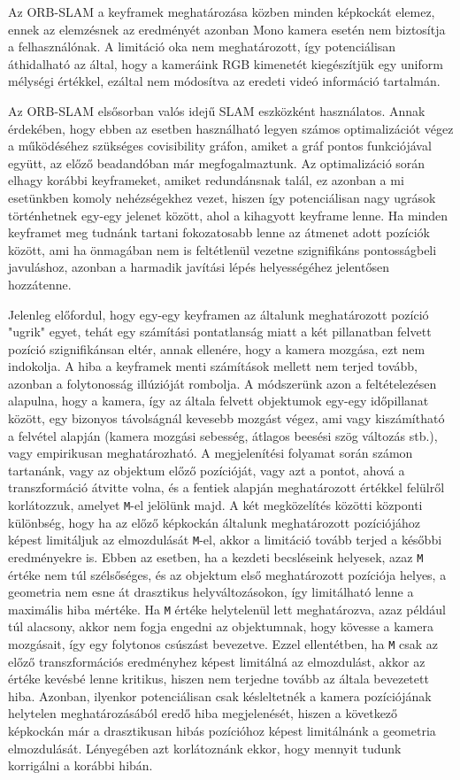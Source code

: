 Az ORB-SLAM a keyframek meghatározása közben minden képkockát elemez, ennek az elemzésnek az eredményét azonban Mono kamera esetén nem biztosítja a felhasználónak.
A limitáció oka nem meghatározott, így potenciálisan áthidalható az által, hogy a kameráink RGB kimenetét kiegészítjük egy uniform mélységi értékkel, ezáltal nem módosítva az eredeti videó információ tartalmán.

Az ORB-SLAM elsősorban valós idejű SLAM eszközként használatos.
Annak érdekében, hogy ebben az esetben használható legyen számos optimalizációt végez a működéséhez szükséges covisibility gráfon, amiket a gráf pontos funkciójával együtt, az előző beadandóban már megfogalmaztunk.
Az optimalizáció során elhagy korábbi keyframeket, amiket redundánsnak talál, ez azonban a mi esetünkben komoly nehézségekhez vezet, hiszen így potenciálisan nagy ugrások történhetnek egy-egy jelenet között, ahol a kihagyott keyframe lenne.
Ha minden keyframet meg tudnánk tartani fokozatosabb lenne az átmenet adott pozíciók között, ami ha önmagában nem is feltétlenül vezetne szignifikáns pontosságbeli javuláshoz, azonban a harmadik javítási lépés helyességéhez jelentősen hozzátenne.

Jelenleg előfordul, hogy egy-egy keyframen az általunk meghatározott pozíció "ugrik" egyet, tehát egy számítási pontatlanság miatt a két pillanatban felvett pozíció szignifikánsan eltér, annak ellenére, hogy a kamera mozgása, ezt nem indokolja.
A hiba a keyframek menti számítások mellett nem terjed tovább, azonban a folytonosság illúzióját rombolja.
A módszerünk azon a feltételezésen alapulna, hogy a kamera, így az általa felvett objektumok egy-egy időpillanat között, egy bizonyos távolságnál kevesebb mozgást végez, ami vagy kiszámítható a felvétel alapján (kamera mozgási sebesség, átlagos beesési szög változás stb.), vagy empirikusan meghatározható.
A megjelenítési folyamat során számon tartanánk, vagy az objektum előző pozícióját, vagy azt a pontot, ahová a transzformáció átvitte volna, és a fentiek alapján meghatározott értékkel felülről korlátozzuk, amelyet \texttt{M}-el jelölünk majd. 
A két megközelítés közötti központi különbség, hogy ha az előző képkockán általunk meghatározott pozíciójához képest limitáljuk az elmozdulását \texttt{M}-el, akkor a limitáció tovább terjed a későbbi eredményekre is.
Ebben az esetben, ha a kezdeti becsléseink helyesek, azaz \texttt{M} értéke nem túl szélsőséges, és az objektum első meghatározott pozíciója helyes, a geometria nem esne át drasztikus helyváltozásokon, így limitálható lenne a maximális hiba mértéke.
Ha \texttt{M} értéke helytelenül lett meghatározva, azaz például túl alacsony, akkor nem fogja engedni az objektumnak, hogy kövesse a kamera mozgásait, így egy folytonos csúszást bevezetve.
Ezzel ellentétben, ha \texttt{M} csak az előző transzformációs eredményhez képest limitálná az elmozdulást, akkor az értéke kevésbé lenne kritikus, hiszen nem terjedne tovább az általa bevezetett hiba.
Azonban, ilyenkor potenciálisan csak késleltetnék a kamera pozíciójának helytelen meghatározásából eredő hiba megjelenését, hiszen a következő képkockán már a drasztikusan hibás pozícióhoz képest limitálnánk a geometria elmozdulását.
Lényegében azt korlátoznánk ekkor, hogy mennyit tudunk korrigálni a korábbi hibán.

